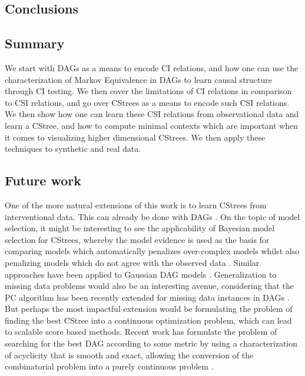 \documentclass{tufte-book}
\begin{document}
\begin{Definition}
\chapter{Conclusions}
\label{sec:org4be5443}
\section{Summary}
\label{sec:orgc91df00}
We start with DAGs as a means to encode CI relations, and how one can use the characterization of Markov Equivalence in DAGs to learn causal structure through CI testing. We then cover the limitations of CI relations in comparison to CSI relations, and go over CStrees as a means to encode such CSI relations. We then show how one can learn these CSI relations from observational data and learn a CStree, and how to compute minimal contexts which are important when it comes to visualizing higher dimensional CStrees. We then apply these techniques to synthetic and real data.


\section{Future work}
\label{sec:org8427dd8}
One of the more natural extensions of this work is to learn CStrees from interventional data. This can already be done with DAGs \cite{yang-2018-charac-learn}. On the topic of model selection, it might be interesting to see the applicability of Bayesian model selection for CStrees, whereby the model evidence is used as the basis for comparing models which automatically penalizes over-complex models whilst also penalizing models which do not agree with the observed data \cite{mackay-1992-bayes-inter}. Similar approaches have been applied to Gaussian DAG models \cite{castelletti-2020-bayes-model}. Generalization to missing data problems would also be an interesting avenue, considering that the PC algorithm has been recently extended for missing data instances in DAGs \cite{tu-2019-causal-discov}. But perhaps the most impactful extension would be formulating the problem of finding the best CStree into a continuous optimization problem, which can lead to scalable score based methods. Recent work has formulate the problem of searching for the best DAG according to some metric by using a characterization of acyclicity that is smooth and exact, allowing the conversion of the combinatorial problem into a purely continuous problem \cite{zheng-2018-dags-no-tears}. 




 \newpage 




\end{Definition}
\end{document}

